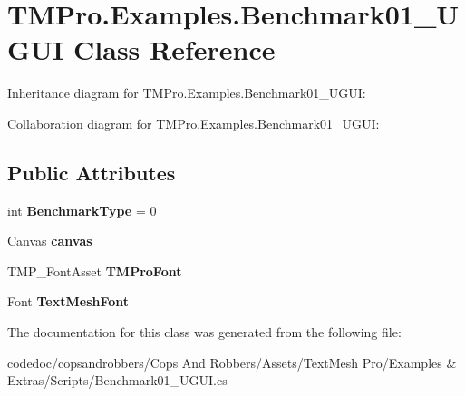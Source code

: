 \hypertarget{classTMPro_1_1Examples_1_1Benchmark01__UGUI}{}\section{T\+M\+Pro.\+Examples.\+Benchmark01\+\_\+\+U\+G\+UI Class Reference}
\label{classTMPro_1_1Examples_1_1Benchmark01__UGUI}


Inheritance diagram for T\+M\+Pro.\+Examples.\+Benchmark01\+\_\+\+U\+G\+UI\+:


Collaboration diagram for T\+M\+Pro.\+Examples.\+Benchmark01\+\_\+\+U\+G\+UI\+:
\subsection*{Public Attributes}
\begin{DoxyCompactItemize}
\item 
\mbox{\label{classTMPro_1_1Examples_1_1Benchmark01__UGUI_a51ddf99f4bea063d19d029efbc672ea8}} 
int {\bfseries Benchmark\+Type} = 0
\item 
\mbox{\label{classTMPro_1_1Examples_1_1Benchmark01__UGUI_a02cfe9754494cce88d818ab75c1da2d9}} 
Canvas {\bfseries canvas}
\item 
\mbox{\label{classTMPro_1_1Examples_1_1Benchmark01__UGUI_a00697aa21ceb618628b504467e786a94}} 
T\+M\+P\+\_\+\+Font\+Asset {\bfseries T\+M\+Pro\+Font}
\item 
\mbox{\label{classTMPro_1_1Examples_1_1Benchmark01__UGUI_a76855aada34fa968c4a26cbe7be9d180}} 
Font {\bfseries Text\+Mesh\+Font}
\end{DoxyCompactItemize}


The documentation for this class was generated from the following file\+:\begin{DoxyCompactItemize}
\item 
codedoc/copsandrobbers/\+Cops And Robbers/\+Assets/\+Text\+Mesh Pro/\+Examples \& Extras/\+Scripts/Benchmark01\+\_\+\+U\+G\+U\+I.\+cs\end{DoxyCompactItemize}

